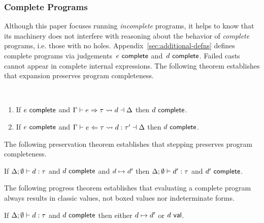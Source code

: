 \subsubsection{Complete Programs} 
%
Although this paper focuses running \emph{incomplete} programs, it helps
to know that its machinery does not interfere
with reasoning about the behavior of \emph{complete} programs, i.e. those
with no holes.
%
Appendix~\ref{sec:additional-defns} defines complete programs via judgements~$e~\mathsf{complete}$ and~$d~\mathsf{complete}$. 
%
Failed casts cannot appear in complete internal expressions. 
%
The following theorem establishes that expansion preserves program completeness.
\begin{thm} ~
  \begin{enumerate}[nolistsep]
    \item
      If $e~\mathsf{complete}$
      and $\Gamma \vdash e \Rightarrow \tau \leadsto d \dashv \Delta$
      then $d~\mathsf{complete}$.
    \item
      If $e~\mathsf{complete}$
      and $\Gamma \vdash e \Leftarrow \tau \leadsto d : \tau' \dashv \Delta$
      then $d~\mathsf{complete}$.
  \end{enumerate}
\end{thm}

The following preservation theorem establishes that stepping preserves program completeness.
\begin{thm}
  If $\Delta; \emptyset \vdash d : \tau$
  and $d~\mathsf{complete}$
  and $d \mapsto d'$
  then $\Delta; \emptyset \vdash d' : \tau$
  and $d'~\mathsf{complete}$.
\end{thm}

The following progress theorem establishes that evaluating a complete
program always results in classic values, not boxed values nor
indeterminate forms.
%
\begin{thm}
  If $\Delta; \emptyset \vdash d : \tau$
  and $d~\mathsf{complete}$
  then either $d \mapsto d'$
  or $d~\mathsf{val}$.
\end{thm}



